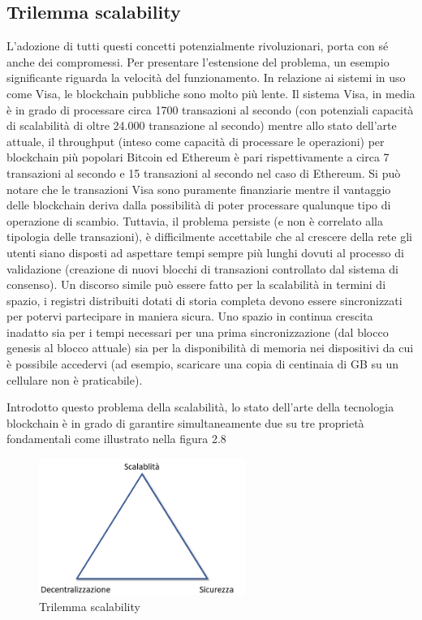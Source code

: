 \subsection{Trilemma scalability}

L'adozione di tutti questi concetti potenzialmente rivoluzionari, porta con sé anche dei compromessi. Per presentare l’estensione del problema, un esempio significante riguarda la velocità del funzionamento. In relazione ai sistemi in uso come Visa, le blockchain pubbliche sono molto più lente. Il sistema Visa, in media è in grado di processare circa 1700 transazioni al secondo (con potenziali capacità di scalabilità di oltre 24.000 transazione al secondo) mentre allo stato dell’arte attuale, il throughput (inteso come capacità di processare le operazioni) per blockchain più popolari Bitcoin ed Ethereum è pari rispettivamente a circa 7 transazioni al secondo e 15 transazioni al secondo nel caso di Ethereum. Si può notare che le transazioni Visa sono puramente finanziarie mentre il vantaggio delle blockchain deriva dalla possibilità di poter processare qualunque tipo di operazione di scambio. Tuttavia, il problema persiste (e non è correlato alla tipologia delle transazioni), è difficilmente accettabile che al crescere della rete gli utenti siano disposti ad aspettare tempi sempre più lunghi dovuti al processo di validazione (creazione di nuovi blocchi di transazioni controllato dal sistema di consenso). Un discorso simile può essere fatto per la scalabilità in termini di spazio, i registri distribuiti dotati di storia completa devono essere sincronizzati per potervi partecipare in maniera sicura. Uno spazio in continua crescita inadatto sia per i tempi necessari per una prima sincronizzazione (dal blocco genesis al blocco attuale) sia per la disponibilità di memoria nei dispositivi da cui è possibile accedervi (ad esempio, scaricare una copia di centinaia di GB su un cellulare non è praticabile). 

Introdotto questo problema della scalabilità, lo stato dell’arte della tecnologia blockchain è in grado di garantire simultaneamente due su tre proprietà fondamentali come illustrato nella figura 2.8

\begin{figure}[H]
\centering
\includegraphics[width=0.6\textwidth]{immagini/trilemmascalab.png}
\caption{Trilemma scalability}
\label{fig:meshtest7x}
\end{figure}

